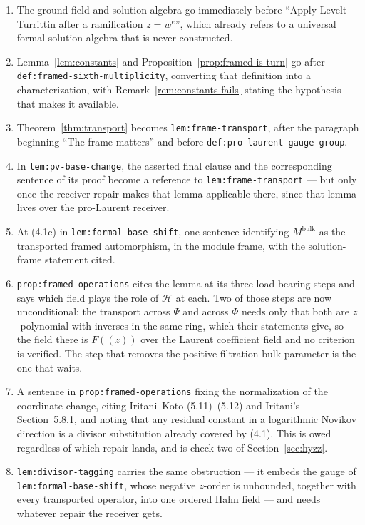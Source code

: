 \documentclass[11pt]{article}
\theoremstyle{definition}
\theoremstyle{remark}
\begin{document}
\begin{enumerate}
\item The ground field and solution algebra go immediately before ``Apply
  Levelt--Turrittin after a ramification $z=w^e$'', which already refers to a
  universal formal solution algebra that is never constructed.
\item Lemma~\ref{lem:constants} and Proposition~\ref{prop:framed-is-turn} go
  after \texttt{def:framed-sixth-multiplicity}, converting that definition into
  a characterization, with Remark~\ref{rem:constants-fails} stating the
  hypothesis that makes it available.
\item Theorem~\ref{thm:transport} becomes \texttt{lem:frame-transport}, after
  the paragraph beginning ``The frame matters'' and before
  \texttt{def:pro-laurent-gauge-group}.
\item In \texttt{lem:pv-base-change}, the asserted final clause and the
  corresponding sentence of its proof become a reference to
  \texttt{lem:frame-transport} --- but only once the receiver repair makes that
  lemma applicable there, since that lemma lives over the pro-Laurent receiver.
\item At (4.1c) in \texttt{lem:formal-base-shift}, one sentence identifying
  $M^{\mathrm{bulk}}$ as the transported framed automorphism, in the module
  frame, with the solution-frame statement cited.
\item \texttt{prop:framed-operations} cites the lemma at its three load-bearing
  steps and says which field plays the role of $\mathcal H$ at each. Two of
  those steps are now unconditional: the transport across $\Psi$ and across
  $\Phi$ needs only that both are $z$-polynomial with inverses in the same ring,
  which their statements give, so the field there is $F(\!(z)\!)$ over the
  Laurent coefficient field and no criterion is verified. The step that removes
  the positive-filtration bulk parameter is the one that waits.
\item A sentence in \texttt{prop:framed-operations} fixing the normalization of
  the coordinate change, citing Iritani--Koto (5.11)--(5.12) and Iritani's
  Section~5.8.1, and noting that any residual constant in a logarithmic Novikov
  direction is a divisor substitution already covered by (4.1). This is owed
  regardless of which repair lands, and is check two of
  Section~\ref{sec:hyzz}.
\item {\sloppy \texttt{lem:divisor-tagging} carries the same obstruction --- it
  embeds the gauge of \texttt{lem:formal-base-shift}, whose negative $z$-order
  is unbounded, together with every transported operator, into one ordered Hahn
  field --- and needs whatever repair the receiver gets.\par}
\end{enumerate}
\end{document}
